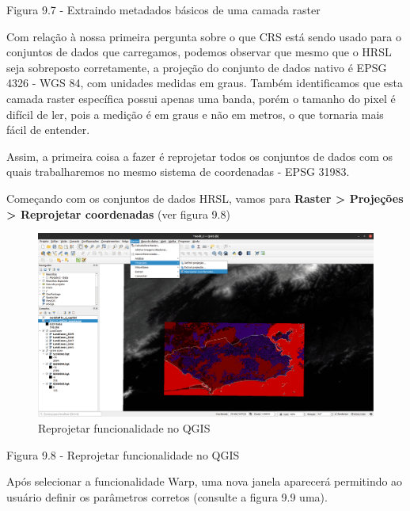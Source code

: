 \documentclass[
]{krantz}
\begin{document}
Figura 9.7 - Extraindo metadados básicos de uma camada raster

Com relação à nossa primeira pergunta sobre o que CRS está sendo usado para o conjuntos de dados que carregamos, podemos observar que mesmo que o HRSL seja sobreposto corretamente, a projeção do conjunto de dados nativo é EPSG 4326 - WGS 84, com unidades medidas em graus. Também identificamos que esta camada raster específica possui apenas uma banda, porém o tamanho do pixel é difícil de ler, pois a medição é em graus e não em metros, o que tornaria mais fácil de entender.

Assim, a primeira coisa a fazer é reprojetar todos os conjuntos de dados com os quais trabalharemos no mesmo sistema de coordenadas - EPSG 31983.

Começando com os conjuntos de dados HRSL, vamos para \textbf{Raster \textgreater{} Projeções \textgreater{} Reprojetar coordenadas} (ver figura 9.8)

\begin{figure}
\centering
\includegraphics{media/modulo9/fig98.png}
\caption{Reprojetar funcionalidade no QGIS}
\end{figure}

Figura 9.8 - Reprojetar funcionalidade no QGIS

Após selecionar a funcionalidade Warp, uma nova janela aparecerá permitindo ao usuário definir os parâmetros corretos (consulte a figura 9.9 uma).
\end{document}
